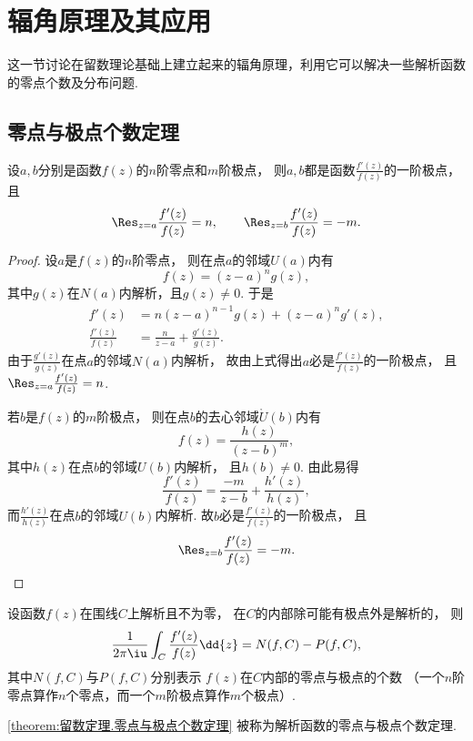 \section{辐角原理及其应用}
这一节讨论在留数理论基础上建立起来的辐角原理，利用它可以解决一些解析函数的零点个数及分布问题.

\subsection{零点与极点个数定理}
\begin{lemma}
设\(a,b\)分别是函数\(f(z)\)的\(n\)阶零点和\(m\)阶极点，
则\(a,b\)都是函数\(\frac{f'(z)}{f(z)}\)的一阶极点，
且\begin{equation*}
	\Res_{z=a} \frac{f'(z)}{f(z)} = n,
	\qquad
	\Res_{z=b} \frac{f'(z)}{f(z)} = -m.
\end{equation*}
\begin{proof}
设\(a\)是\(f(z)\)的\(n\)阶零点，
则在点\(a\)的邻域\(U(a)\)内有\begin{equation*}
	f(z) = (z-a)^n g(z),
\end{equation*}
其中\(g(z)\)在\(N(a)\)内解析，且\(g(z)\neq0\).
于是\begin{align*}
	f'(z) &= n(z-a)^{n-1} g(z) + (z-a)^n g'(z), \\
	\frac{f'(z)}{f(z)} &= \frac{n}{z-a} + \frac{g'(z)}{g(z)}.
\end{align*}
由于\(\frac{g'(z)}{g(z)}\)在点\(a\)的邻域\(N(a)\)内解析，
故由上式得出\(a\)必是\(\frac{f'(z)}{f(z)}\)的一阶极点，
且\(\Res_{z=a} \frac{f'(z)}{f(z)} = n\).

若\(b\)是\(f(z)\)的\(m\)阶极点，
则在点\(b\)的去心邻域\(\mathring{U}(b)\)内有\begin{equation*}
	f(z) = \frac{h(z)}{(z-b)^m},
\end{equation*}
其中\(h(z)\)在点\(b\)的邻域\(U(b)\)内解析，
且\(h(b)\neq0\).
由此易得\begin{equation*}
	\frac{f'(z)}{f(z)}
	= \frac{-m}{z-b} + \frac{h'(z)}{h(z)},
\end{equation*}
而\(\frac{h'(z)}{h(z)}\)在点\(b\)的邻域\(U(b)\)内解析.
故\(b\)必是\(\frac{f'(z)}{f(z)}\)的一阶极点，
且\begin{equation*}
	\Res_{z=b} \frac{f'(z)}{f(z)} = -m.
	\qedhere
\end{equation*}
\end{proof}
\end{lemma}

\begin{theorem}\label{theorem:留数定理.零点与极点个数定理}%
设函数\(f(z)\)在围线\(C\)上解析且不为零，
在\(C\)的内部除可能有极点外是解析的，
则\begin{equation}\label{equation:留数定理.零点与极点个数定理1}
	\frac{1}{2\pi\iu}
	\int_C \frac{f'(z)}{f(z)} \dd{z}
	= N(f,C) - P(f,C),
\end{equation}
其中\(N(f,C)\)与\(P(f,C)\)分别表示
\(f(z)\)在\(C\)内部的零点与极点的个数
（一个\(n\)阶零点算作\(n\)个零点，而一个\(m\)阶极点算作\(m\)个极点）.
\end{theorem}
\cref{theorem:留数定理.零点与极点个数定理} 被称为{解析函数的零点与极点个数定理}.

